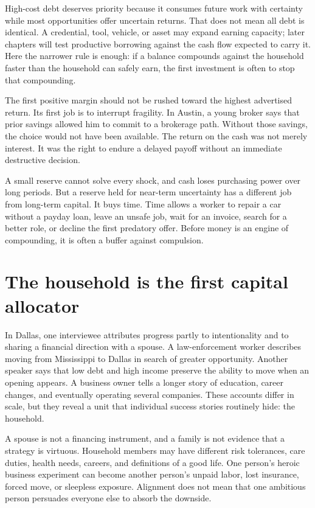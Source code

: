 High-cost debt deserves priority because it consumes future work with
certainty while most opportunities offer uncertain returns. That does not mean
all debt is identical. A credential, tool, vehicle, or asset may expand earning
capacity; later chapters will test productive borrowing against the cash flow
expected to carry it. Here the narrower rule is enough: if a balance compounds
against the household faster than the household can safely earn, the first
investment is often to stop that compounding.

The first positive margin should not be rushed toward the highest advertised
return. Its first job is to interrupt fragility. In Austin, a young broker says
that prior savings allowed him to commit to a brokerage path. Without those
savings, the choice would not have been available. The return on the cash was
not merely interest. It was the right to endure a delayed payoff without an
immediate destructive decision.

A small reserve cannot solve every shock, and cash loses purchasing power over
long periods. But a reserve held for near-term uncertainty has a different job
from long-term capital. It buys time. Time allows a worker to repair a car
without a payday loan, leave an unsafe job, wait for an invoice, search for a
better role, or decline the first predatory offer. Before money is an engine of
compounding, it is often a buffer against compulsion.

\section{The household is the first capital allocator}

In Dallas, one interviewee attributes progress partly to intentionality and to
sharing a financial direction with a spouse. A law-enforcement worker describes
moving from Mississippi to Dallas in search of greater opportunity. Another
speaker says that low debt and high income preserve the ability to move when an
opening appears. A business owner tells a longer story of education, career
changes, and eventually operating several companies. These accounts differ in
scale, but they reveal a unit that individual success stories routinely hide:
the household.

A spouse is not a financing instrument, and a family is not evidence that a
strategy is virtuous. Household members may have different risk tolerances,
care duties, health needs, careers, and definitions of a good life. One
person's heroic business experiment can become another person's unpaid labor,
lost insurance, forced move, or sleepless exposure. Alignment does not mean
that one ambitious person persuades everyone else to absorb the downside.

